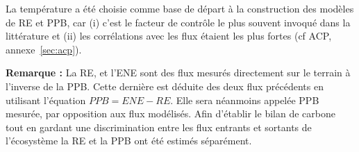 
 


La température a été choisie comme base de départ à la construction des modèles de RE et PPB, car (i) c'est le facteur de contrôle le plus souvent invoqué dans la littérature et (ii) les corrélations avec les flux étaient les plus fortes (cf ACP, annexe~\ref{sec:acp}).

\begin{center}
\begin{minipage}{.85\textwidth}
\setlength{\parindent}{-10pt}%
\onehalfspacing
\textbf{Remarque :} La RE, et l'ENE sont des flux mesurés directement sur le terrain à l'inverse de la PPB.
Cette dernière est déduite des deux flux précédents en utilisant l'équation $PPB = ENE - RE$.
Elle sera néanmoins appelée PPB mesurée, par opposition aux flux modélisés.
Afin d'établir le bilan de carbone tout en gardant une discrimination entre les flux entrants et sortants de l'écosystème la RE et la PPB ont été estimés séparément.
\end{minipage}
\end{center}


